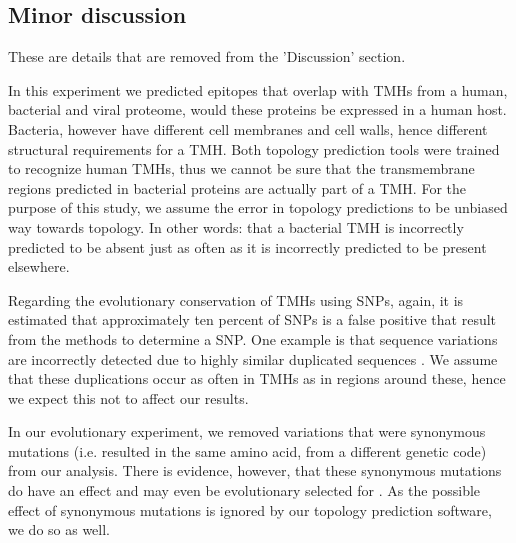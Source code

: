 \subsection{Minor discussion}

These are details that are removed from the 'Discussion' section.


In this experiment we predicted epitopes that overlap with 
TMHs from a human, bacterial and viral proteome,
would these proteins be expressed in a human host.
Bacteria, however have different cell membranes and cell walls, 
hence different structural requirements for a TMH.
Both topology prediction tools were trained to recognize
human TMHs, thus we cannot be sure that
the transmembrane regions predicted in bacterial proteins
are actually part of a TMH.
For the purpose of this study, we assume the 
error in topology predictions to be unbiased way towards topology.
In other words: that a bacterial TMH is incorrectly
predicted to be absent just as often as it is incorrectly
predicted to be present elsewhere.


Regarding the evolutionary conservation of TMHs using SNPs,
again, it is estimated that approximately ten percent
of SNPs is a false positive that result from the methods to determine
a SNP. One example is that sequence variations are incorrectly
detected due to highly similar duplicated sequences \cite{musumeci2010single}.
We assume that these duplications occur as often in TMHs as in
regions around these, hence we expect this not to affect our results.

%
In our evolutionary experiment, 
we removed variations that were synonymous mutations (i.e.
resulted in the same amino acid, from a different genetic code) 
from our analysis.
There is evidence, however, that these synonymous mutations
do have an effect and may even be evolutionary selected 
for \cite{hunt2009silent}.
As the possible effect of synonymous mutations is ignored by our
topology prediction software, we do so as well.

